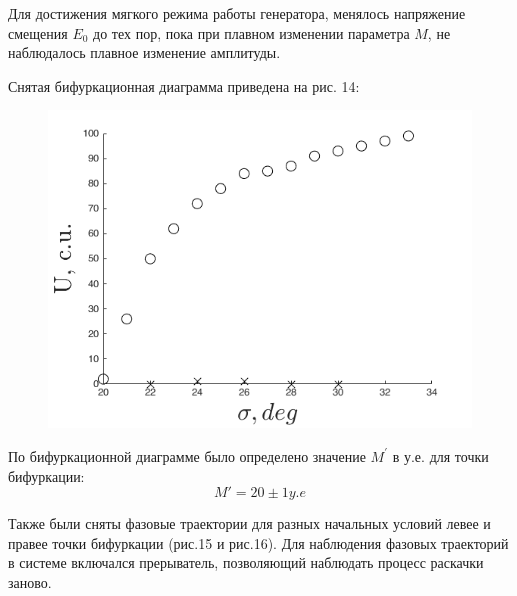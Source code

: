 Для достижения мягкого режима работы генератора, менялось напряжение смещения $E_0$ до тех пор, пока при плавном изменении параметра $M$,
 не наблюдалось плавное изменение амплитуды. 

Снятая бифуркационная диаграмма приведена на рис. 14:
 \begin{center}
    \begin{figure}[H]
        \vspace{-10pt}
            \includegraphics[]{graph/g1.png} 
            \vspace{-10pt}
            \label{fig:10}
            \vspace{-20pt}
    \end{figure}
\end{center} 
По бифуркационной диаграмме было определено значение $M^{'}$ в у.е. для точки бифуркации:
$$M' = 20 \pm 1 y.e $$

Также были сняты фазовые траектории для разных начальных условий левее и правее точки бифуркации (рис.15 и рис.16).
Для наблюдения фазовых траекторий в системе включался прерыватель, позволяющий наблюдать процесс раскачки заново.

